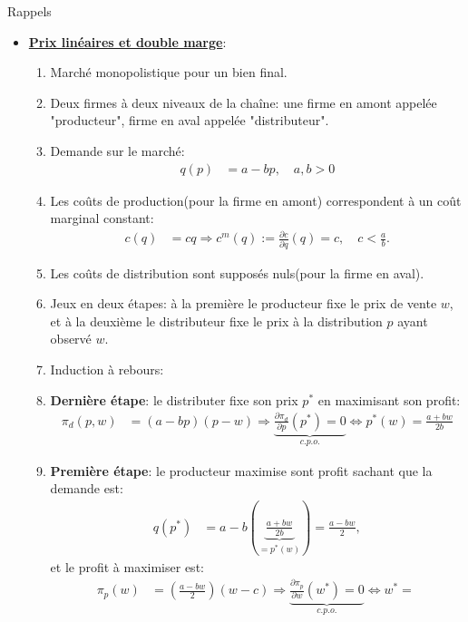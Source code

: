 \begin{frame}[allowframebreaks]{Rappels}
\begin{itemize}
\item \textbf{\underline{Prix linéaires et double marge}}:
\begin{enumerate}[$\star$]
\item Marché monopolistique pour un bien final. 
\item Deux firmes à deux niveaux de la chaîne: une firme en amont appelée "producteur", firme en aval appelée "distributeur".
\item Demande sur le marché: 
\begin{align*}
    q(p) &= a-bp, \quad a, b > 0
\end{align*}
\item Les coûts de production(pour la firme en amont) correspondent à un coût marginal constant:
\begin{align*}
    c(q) &= cq \Rightarrow c^{m}(q) := \frac{\partial c}{\partial q}(q) = c, \quad c<\frac{a}{b}.
\end{align*}
\item Les coûts de distribution sont supposés nuls(pour la firme en aval). 
\item Jeux en deux étapes: à la première le producteur fixe le prix de vente $w$, et à la deuxième le distributeur fixe 
le prix à la distribution $p$ ayant observé $w$. 
\item Induction à rebours:

\item \textbf{Dernière étape}: le distributer fixe son prix $p^*$ en maximisant son profit: 
\begin{align*}
    \pi_d(p, w) &= (a-bp)(p-w) \Rightarrow \underbrace{\frac{\partial \pi_d}{\partial p}(p^*) = 0}_{c.p.o.} \Leftrightarrow p^*(w) = \frac{a+bw}{2b}
\end{align*}
\item \textbf{Première étape}: le producteur maximise sont profit sachant que la demande est:
\begin{align*}
    q(p^*) &= a-b\left(\underbrace{\frac{a+bw}{2b}}_{=p^*(w)}\right) = \frac{a-bw}{2},
\end{align*}
et le profit à maximiser est:
\begin{align*}
    \pi_p(w) &= \left(\frac{a-bw}{2}\right)(w - c) \Rightarrow \underbrace{\frac{\partial \pi_p}{\partial w}(w^*) = 0}_{c.p.o.} 
    \Leftrightarrow w^* = \
\end{align*}


\end{enumerate}
\framebreak


\end{itemize}
\end{frame}
